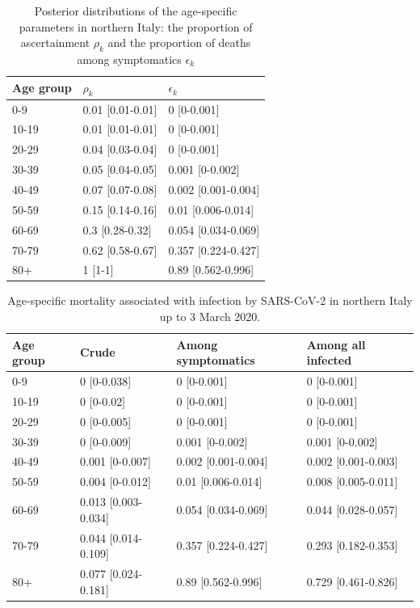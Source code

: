 \documentclass{article}
\begin{document}
\begin{table}[H]
	\caption{Posterior distributions of the age-specific parameters in northern Italy: the proportion of ascertainment $\rho_k$ and the proportion of deaths among symptomatics $\epsilon_k$}
	\centering
	\begin{tabular}{lll}
		\hline
		Age group & $\rho_k$ & $\epsilon_k$ \\ 
		\hline
		0-9 & 0.01 [0.01-0.01] & 0 [0-0.001] \\ 
		10-19 & 0.01 [0.01-0.01] & 0 [0-0.001] \\ 
		20-29 & 0.04 [0.03-0.04] & 0 [0-0.001] \\ 
		30-39 & 0.05 [0.04-0.05] & 0.001 [0-0.002] \\ 
		40-49 & 0.07 [0.07-0.08] & 0.002 [0.001-0.004] \\ 
		50-59 & 0.15 [0.14-0.16] & 0.01 [0.006-0.014] \\ 
		60-69 & 0.3 [0.28-0.32] & 0.054 [0.034-0.069] \\ 
		70-79 & 0.62 [0.58-0.67] & 0.357 [0.224-0.427] \\ 
		80+ & 1 [1-1] & 0.89 [0.562-0.996] \\ 
		\hline
	\end{tabular}
\end{table}


\begin{table}[H]
	\caption{Age-specific mortality associated with infection by SARS-CoV-2 in northern Italy up to 3 March 2020.}
	\centering
	\begin{tabular}{llll}
		\hline
		Age group & Crude & Among symptomatics & Among all infected \\ 
		\hline
		0-9 & 0 [0-0.038] & 0 [0-0.001] & 0 [0-0.001] \\ 
		10-19 & 0 [0-0.02] & 0 [0-0.001] & 0 [0-0.001] \\ 
		20-29 & 0 [0-0.005] & 0 [0-0.001] & 0 [0-0.001] \\ 
		30-39 & 0 [0-0.009] & 0.001 [0-0.002] & 0.001 [0-0.002] \\ 
		40-49 & 0.001 [0-0.007] & 0.002 [0.001-0.004] & 0.002 [0.001-0.003] \\ 
		50-59 & 0.004 [0-0.012] & 0.01 [0.006-0.014] & 0.008 [0.005-0.011] \\ 
		60-69 & 0.013 [0.003-0.034] & 0.054 [0.034-0.069] & 0.044 [0.028-0.057] \\ 
		70-79 & 0.044 [0.014-0.109] & 0.357 [0.224-0.427] & 0.293 [0.182-0.353] \\ 
		80+ & 0.077 [0.024-0.181] & 0.89 [0.562-0.996] & 0.729 [0.461-0.826] \\ 
		\hline
	\end{tabular}
\end{table}
\end{document}
